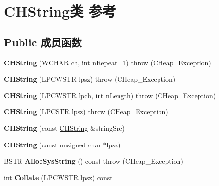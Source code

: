 \hypertarget{class_c_h_string}{}\section{C\+H\+String类 参考}
\label{class_c_h_string}
\subsection*{Public 成员函数}
\begin{DoxyCompactItemize}
\item 
\mbox{\label{class_c_h_string_af011155ddf5e3e6c830af57c8feba8e1}} 
{\bfseries C\+H\+String} (W\+C\+H\+AR ch, int n\+Repeat=1)  throw (\+C\+Heap\+\_\+\+Exception)
\item 
\mbox{\label{class_c_h_string_a4a74c315ab39a94f2f96abcfd9d18aad}} 
{\bfseries C\+H\+String} (L\+P\+C\+W\+S\+TR lpsz)  throw (\+C\+Heap\+\_\+\+Exception)
\item 
\mbox{\label{class_c_h_string_a591951c7b0659fea8d99b35d1dbb0016}} 
{\bfseries C\+H\+String} (L\+P\+C\+W\+S\+TR lpch, int n\+Length)  throw (\+C\+Heap\+\_\+\+Exception)
\item 
\mbox{\label{class_c_h_string_aa252f00690910531d15a36131bdeb159}} 
{\bfseries C\+H\+String} (L\+P\+C\+S\+TR lpsz)  throw (\+C\+Heap\+\_\+\+Exception)
\item 
\mbox{\label{class_c_h_string_a2bdb42efc07da097e1393939123af6d0}} 
{\bfseries C\+H\+String} (const \hyperlink{class_c_h_string}{C\+H\+String} \&string\+Src)
\item 
\mbox{\label{class_c_h_string_a1ed3bb5dac8bcdb9003858582b81bbab}} 
{\bfseries C\+H\+String} (const unsigned char $\ast$lpsz)
\item 
\mbox{\label{class_c_h_string_a637f21fcd7a3a1c763a3e42ba6a609d5}} 
B\+S\+TR {\bfseries Alloc\+Sys\+String} () const  throw (\+C\+Heap\+\_\+\+Exception)
\item 
\mbox{\label{class_c_h_string_a4fae6525edfee59f8e8a3b541c6d861b}} 
int {\bfseries Collate} (L\+P\+C\+W\+S\+TR lpsz) const

\end{DoxyCompactItemize}
